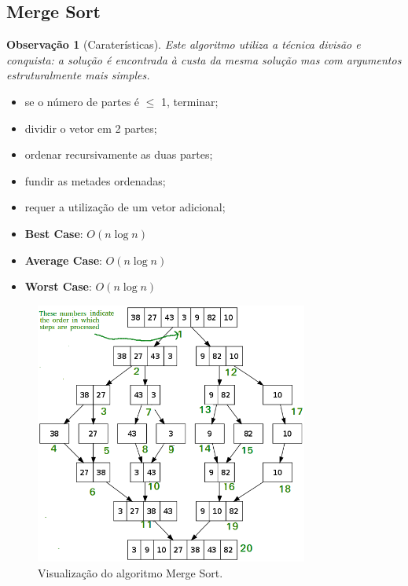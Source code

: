 \documentclass[a4paper, 12pt]{article}
\newtheorem{remark}{Observação}
\begin{document}
\subsection{Merge Sort}
\begin{remark}[Caraterísticas]
    Este algoritmo utiliza a técnica divisão e conquista: a solução é encontrada à custa da mesma solução mas com argumentos estruturalmente mais simples.\end{remark}
    \begin{itemize}
        \item se o número de partes é $\leq$ 1, terminar;
        \item dividir o vetor em 2 partes;
        \item ordenar recursivamente as duas partes;
        \item fundir as metades ordenadas;
    \end{itemize}
    \begin{itemize}
        \item requer a utilização de um vetor adicional;
        \item \textbf{Best Case}: $O(n\log n)$
        \item \textbf{Average Case}: $O(n\log n)$
        \item \textbf{Worst Case}: $O(n\log n)$
    \end{itemize}


\begin{center}
    \begin{figure}[H]
        \centering
        \includegraphics[width=0.8\textwidth]{fig/ao/ms.png}
        \caption{Visualização do algoritmo Merge Sort.}
    \end{figure}
\end{center}
\end{document}
